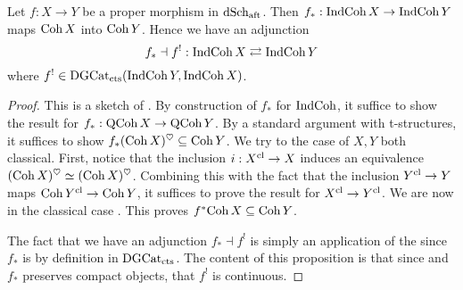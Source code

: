 \documentclass[./main.tex]{subfiles}
\begin{document}
\begin{prop}
  
  Let $f : X \to Y$ be a proper morphism in $\mathrm{dSch}_{\mathrm{aft}}$.
  Then $f_* : \mathrm{IndCoh}\,X \to \mathrm{IndCoh}\,Y$ maps
  $\mathrm{Coh}\,X$ into $\mathrm{Coh}\,Y$.
  Hence we have an adjunction \[
    f_* \dashv f^! : \mathrm{IndCoh}\,X \rightleftarrows \mathrm{IndCoh}\,Y  
  \]
  where $f^! \in \mathrm{DGCat}_{\mathrm{cts}}(\mathrm{IndCoh}\,Y , \mathrm{IndCoh}\,X)$.

\end{prop}
\begin{proof}
  This is a sketch of \cite[Ch 4, 5.1.4]{GR1}.
  By construction of $f_*$ for $\mathrm{IndCoh}$,
  it suffice to show the result for $f_* : \mathrm{QCoh}\,X \to \mathrm{QCoh}\,Y$.
  By a standard argument with t-structures,
  it suffices to show $f_* (\mathrm{Coh}\,X)^\heartsuit \subseteq \mathrm{Coh}\,Y$.
  We try to the case of $X, Y$ both classical.
  First, notice that the inclusion $i : X^{\mathrm{cl}} \to X$ induces an equivalence
  $(\mathrm{Coh}\,X)^\heartsuit \simeq (\mathrm{Coh}\,X)^\heartsuit$.
  Combining this with the fact that the inclusion
  $Y^{\mathrm{cl}} \to Y$ maps $\mathrm{Coh}\,Y^{\mathrm{cl}} \to \mathrm{Coh}\,Y$,
  it suffices to prove the result for $X^{\mathrm{cl}} \to Y^{\mathrm{cl}}$.
  We are now in the classical case \cite[Prop 30.19.1]{stacks}.
  This proves $f^* \mathrm{Coh}\,X \subseteq \mathrm{Coh}\,Y$.

  The fact that we have an adjunction $f_* \dashv f^!$
  is simply an application of the 
  since $f_*$ is by definition in $\mathrm{DGCat}_{\mathrm{cts}}$.
  The content of this proposition is that
  since 
  and $f_*$ preserves compact objects,
   that $f^!$ is continuous.
\end{proof}
\end{document}
